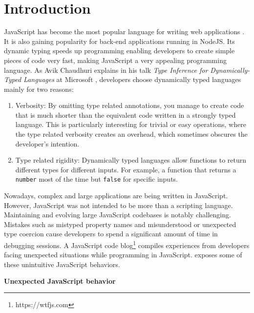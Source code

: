 \chapter{Introduction}\label{chap:introduction}

JavaScript has become the most popular language for writing web applications \citep{github-statistics}. It is also gaining popularity for back-end applications running in NodeJS. Its dynamic typing speeds up programming enabling developers to create simple pieces of code very fast, making JavaScript a very appealing programming language. As Avik Chaudhuri explains in his talk \textit{Type Inference for Dynamically-Typed Languages} at Microsoft \citep{type-inference-microsoft-research-video}, developers choose dynamically typed languages mainly for two reasons:

\begin{enumerate}
	\item Verbosity: By omitting type related annotations, you manage to create code that is much shorter than the equivalent code written in a strongly typed language. This is particularly interesting for trivial or easy operations, where the type related verbosity creates an overhead, which sometimes obscures the developer's intention.

	\item Type related rigidity: Dynamically typed languages allow functions to return different types for different inputs. For example, a function that returns a \texttt{number} most of the time but \texttt{false} for specific inputs.
\end{enumerate}

Nowadays, complex and large applications are being written in JavaScript. However, JavaScript was not intended to be more than a scripting language. Maintaining and evolving large JavaScript codebases is notably challenging. Mistakes such as mistyped property names and misunderstood or unexpected type coercion cause developers to spend a significant amount of time in debugging sessions. A JavaScript code blog\footnote{https://wtfjs.com} compiles experiences from developers facing unexpected situations while programming in JavaScript.  exposes some of these unintuitive JavaScript behaviors.

\begin{code}
	\captionsetup{aboveskip=0pt, belowskip=10pt}
	\caption[Unexpected JavaScript behavior]{\textbf{Unexpected JavaScript behavior}}
	\label{code:introduction-javascript-wtfs}
  \end{code}

